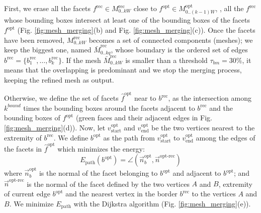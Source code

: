 First, we erase all the facets  $f^{\text{rec}} \in \mathit{M}_{0..kW}^{\text{rec}}$ close to $f^{\text{opt}} \in \mathit{M}_{0..(k-1)W}^{\text{opt}}$, \ie, all the $f^{\text{rec}}$ whose bounding boxes intersect at least one of the bounding boxes of the facets $f^{\text{opt}}$ (Fig. \ref{fig:mesh_merging}(b) and Fig. \ref{fig:mesh_merging}(c)).
Once the facets have been removed, $\mathit{M}_{0..kW}^{\text{rec}}$ becomes a set of connected components (meshes); we keep the biggest one, named $\mathit{\bar{M}}_{0..kq}^{\text{rec}}$, whose boundary is the ordered set of edges $\mathit{b}^{\text{rec}} = \{b_1^{\text{rec}}, \dots,  b_k^{\text{rec}}\}$.
If the mesh $\mathit{\bar{M}}_{0..kW}^{\text{rec}}$ is smaller than a threshold $\tau_{bm}=30\%$, it means that the overlapping is predominant and we stop the merging process, keeping the refined mesh as output.

Otherwise, we define the set of facets $\hat{f}^{\text{opt}}$ near to $\mathit{b}^{\text{rec}}$, as the intersection among  $k^{bound}$ times the bounding boxes around the facets adjacent to  $\mathit{b}^{\text{rec}}$ and the bounding boxes of $f^{\text{opt}}$  (green faces and their adjacent edges in Fig. \ref{fig:mesh_merging}(d)).
Now, let  $v_{\text{start}}^{\text{opt}}$ and $v_{\text{end}}^{\text{opt}}$ be the two vertices nearest to the extremity of  $\mathit{b}^{\text{rec}}$. 
We define $\mathit{b}^{\text{opt}}$ as the path from $v_{\text{start}}^{\text{opt}}$ to $v_{\text{end}}^{\text{opt}}$ among the edges of the facets in $\hat{f}^{\text{opt}}$ which minimizes the energy:
\begin{equation}
  E_{\text{path}}(b^{\text{opt}}) = \angle (\overrightarrow{n}_b^{\text{opt}},\overrightarrow{n}^{\text{opt-rec}})
\end{equation}
where $\overrightarrow{n}_b^{\text{opt}}$ is the normal of the facet belonging to $\mathit{b}^{\text{opt}}$ and adjacent to  $b^{\text{opt}}$; and
$\overrightarrow{n}^{\text{opt-rec}}$ is the normal of the facet defined by the two vertices $A$ and $B$, extremity of current edge ${b}^{\text{opt}}$ and the nearest vertex in the border $\mathit{b}^{\text{rec}}$ to the vertices $A$ and $B$.
We minimize $E_{\text{path}}$ with the Dijkstra algorithm  (Fig. \ref{fig:mesh_merging}(e)).

